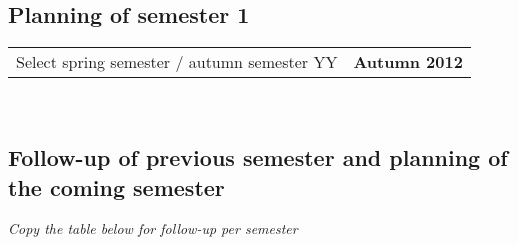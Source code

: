 \subsection{Planning of semester 1}
\begin{tabular}{p{4cm}p{3cm}}
\raggedright Select spring semester / autumn semester YY &
\cellcolor[gray]{0.95}\bf    Autumn 2012     \\
\end{tabular}\\

\subsection{Follow-up of previous semester and planning of the coming semester}
\textit{Copy the table below for follow-up per semester}

